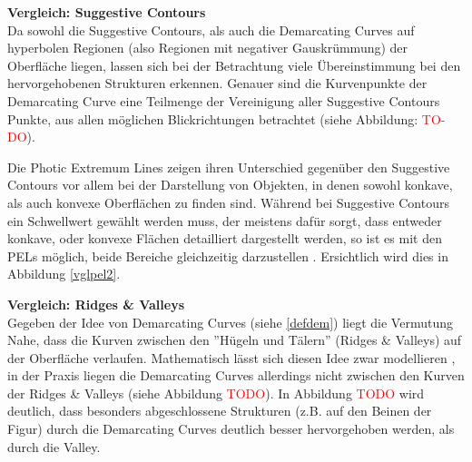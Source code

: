 \documentclass{paperStyle}
\newcommand\todo[1]{\textcolor{red}{#1}}
\begin{document}
\textbf{Vergleich: Suggestive Contours}\\
Da sowohl die Suggestive Contours, als auch die Demarcating Curves auf hyperbolen Regionen (also Regionen mit negativer Gauskrümmung) der Oberfläche liegen, lassen sich bei der Betrachtung viele Übereinstimmung bei den hervorgehobenen Strukturen erkennen. Genauer sind die Kurvenpunkte der Demarcating Curve eine Teilmenge der Vereinigung aller Suggestive Contours Punkte, aus allen möglichen Blickrichtungen betrachtet \cite{Demarcating}(siehe Abbildung: \todo{TO-DO}).  

Die Photic Extremum Lines zeigen ihren Unterschied gegenüber den Suggestive Contours vor allem bei der Darstellung von Objekten, in denen sowohl konkave, als auch konvexe Oberflächen zu finden sind. Während bei Suggestive Contours ein Schwellwert gewählt werden muss, der meistens dafür sorgt, dass entweder konkave, oder konvexe Flächen detailliert dargestellt werden, so ist es mit den PELs möglich, beide Bereiche gleichzeitig darzustellen \cite{Xie2007}. Ersichtlich wird dies in Abbildung \ref{vglpel2}.

\textbf{Vergleich: Ridges \& Valleys}\\
Gegeben der Idee von Demarcating Curves (siehe \ref{defdem}) liegt die Vermutung Nahe, dass die Kurven zwischen den ''Hügeln und Tälern'' (Ridges \& Valleys) auf der Oberfläche verlaufen. Mathematisch lässt sich diesen Idee zwar modellieren \cite{Demarcating}, in der Praxis liegen die Demarcating Curves allerdings nicht zwischen den Kurven der Ridges \& Valleys (siehe Abbildung \todo{TODO}). In Abbildung \todo{TODO} wird deutlich, dass besonders abgeschlossene Strukturen (z.B. auf den Beinen der Figur) durch die Demarcating Curves deutlich besser hervorgehoben werden, als durch die Valley.
\end{document}
